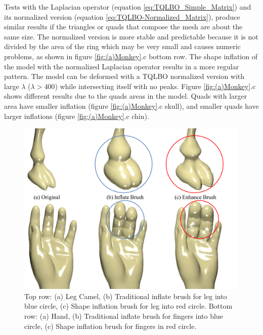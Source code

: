 \documentclass[10pt, conference]{IEEEtran}
\begin{document}
Tests with the Laplacian operator (equation \ref{eq:TQLBO_Simple_Matrix})
and its normalized version (equation \ref{eq:TQLBO-Normalized_Matrix}),
produce similar results if the triangles or quads that compose the
mesh are about the same size. The normalized version is more stable
and predictable because it is not divided by the area of the ring
which may be very small and causes numeric problems, as shown in figure
\ref{fig:(a)Monkey}.c bottom row. The shape inflation of the model
with the normalized Laplacian operator results in a more regular pattern.
The model can be deformed with a TQLBO normalized version with large
$\lambda$ ($\lambda>400$) while intersecting itself with no peaks.
Figure \ref{fig:(a)Monkey}.c shows different results due to the quads
areas in the model. Quads with larger area have smaller inflation
(figure \ref{fig:(a)Monkey}.c skull), and smaller quads have larger
inflations (figure \ref{fig:(a)Monkey}.c chin).

\begin{figure}
\includegraphics[width=1\columnwidth]{figs/sculpt_brush}

\caption{\label{fig:Sculpt_Brush}Top row: (a) Leg Camel, (b) Traditional inflate brush
for leg into blue circle, (c) Shape inflation brush for leg into red
circle. Bottom row: (a) Hand, (b) Traditional inflate brush for fingers into blue
circle, (c) Shape inflation brush for fingers in red circle.}
\end{figure}
\end{document}
